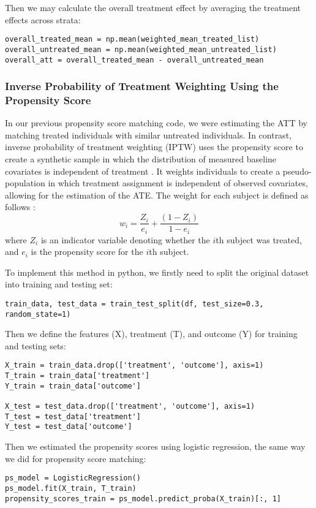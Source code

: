 \documentclass{article}
\begin{document}
\noindent Then we may calculate the overall treatment effect by averaging the treatment effects across strata:
\begin{verbatim}
overall_treated_mean = np.mean(weighted_mean_treated_list)
overall_untreated_mean = np.mean(weighted_mean_untreated_list)
overall_att = overall_treated_mean - overall_untreated_mean
\end{verbatim}

\subsubsection{Inverse Probability of Treatment Weighting Using the Propensity Score}
In our previous propensity score matching code, we were estimating the ATT by matching treated individuals with similar untreated individuals. In contrast, inverse probability of treatment weighting (IPTW) uses the propensity score to create a synthetic sample in which the distribution of measured baseline covariates is independent of treatment \cite{morgan2008diagnostic}. It weights individuals to create a pseudo-population in which treatment assignment is independent of observed covariates, allowing for the estimation of the ATE. The weight for each subject is defined as follows \cite{austin2011introduction}:
\[
w_i = \frac{Z_i}{e_i} + \frac{(1 - Z_i)}{1 - e_i}
\]
where \(Z_i\) is an indicator variable denoting whether the \(i\)th subject was treated, and \(e_i\) is the propensity score for the \(i\)th subject. 

\noindent To implement this method in python, we firstly need to split the original dataset into training and testing set:

\begin{verbatim}
train_data, test_data = train_test_split(df, test_size=0.3, random_state=1)
\end{verbatim}

\noindent Then we define the features (X), treatment (T), and outcome (Y) for training and testing sets:
\begin{verbatim}
X_train = train_data.drop(['treatment', 'outcome'], axis=1)
T_train = train_data['treatment']
Y_train = train_data['outcome']

X_test = test_data.drop(['treatment', 'outcome'], axis=1)
T_test = test_data['treatment']
Y_test = test_data['outcome']
\end{verbatim}

\noindent Then we estimated the propensity scores using logistic regression, the same way we did for propensity score matching:
\begin{verbatim}
ps_model = LogisticRegression()
ps_model.fit(X_train, T_train)
propensity_scores_train = ps_model.predict_proba(X_train)[:, 1]
\end{verbatim}
\end{document}
